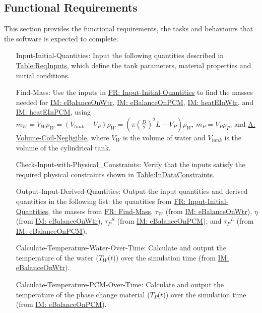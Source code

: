 \documentclass[12pt]{article}
\begin{document}
\subsection{Functional Requirements}
\label{Sec:FRs}
This section provides the functional requirements, the tasks and behaviours that the software is expected to complete.
\begin{itemize}
\item[Input-Initial-Quantities:\phantomsection\label{inputInitQuants}]Input the following quantities described in \hyperref[Table:ReqInputs]{Table:ReqInputs}, which define the tank parameters, material properties and initial conditions.
\item[Find-Mass:\phantomsection\label{findMass}]Use the inputs in \hyperref[inputInitQuants]{FR: Input-Initial-Quantities} to find the masses needed for \hyperref[IM:eBalanceOnWtr]{IM: eBalanceOnWtr}, \hyperref[IM:eBalanceOnPCM]{IM: eBalanceOnPCM}, \hyperref[IM:heatEInWtr]{IM: heatEInWtr}, and \hyperref[IM:heatEInPCM]{IM: heatEInPCM}, using ${m_{W}}={V_{W}} {ρ_{W}}=\left({V_{tank}}-{V_{P}}\right) {ρ_{W}}=\left(π \left(\frac{D}{2}\right)^{2} L-{V_{P}}\right) {ρ_{W}}$, ${m_{P}}={V_{P}} {ρ_{P}}$, and \hyperref[assumpVCN]{A: Volume-Coil-Negligible}, where ${V_{W}}$ is the volume of water and ${V_{tank}}$ is the volume of the cylindrical tank.
\item[Check-Input-with-Physical\_Constraints:\phantomsection\label{checkWithPhysConsts}]Verify that the inputs satisfy the required physical constraints shown in \hyperref[Table:InDataConstraints]{Table:InDataConstraints}.
\item[Output-Input-Derived-Quantities:\phantomsection\label{outputInputDerivQuants}]Output the input quantities and derived quantities in the following list: the quantities from \hyperref[inputInitQuants]{FR: Input-Initial-Quantities}, the masses from \hyperref[findMass]{FR: Find-Mass}, ${τ_{W}}$ (from \hyperref[IM:eBalanceOnWtr]{IM: eBalanceOnWtr}), $η$ (from \hyperref[IM:eBalanceOnWtr]{IM: eBalanceOnWtr}), ${{τ_{P}}^{S}}$ (from \hyperref[IM:eBalanceOnPCM]{IM: eBalanceOnPCM}), and ${{τ_{P}}^{L}}$ (from \hyperref[IM:eBalanceOnPCM]{IM: eBalanceOnPCM}).
\item[Calculate-Temperature-Water-Over-Time:\phantomsection\label{calcTempWtrOverTime}]Calculate and output the temperature of the water (${T_{W}}$($t$)) over the simulation time (from \hyperref[IM:eBalanceOnWtr]{IM: eBalanceOnWtr}).
\item[Calculate-Temperature-PCM-Over-Time:\phantomsection\label{calcTempPCMOverTime}]Calculate and output the temperature of the phase change material (${T_{P}}$($t$)) over the simulation time (from \hyperref[IM:eBalanceOnPCM]{IM: eBalanceOnPCM}).

\end{itemize}
\end{document}
